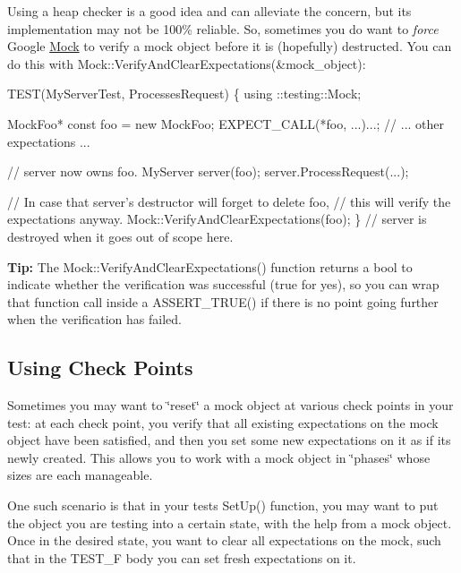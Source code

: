 Using a heap checker is a good idea and can alleviate the concern, but its implementation may not be 100\% reliable. So, sometimes you do want to {\itshape force} Google \hyperlink{class_mock}{Mock} to verify a mock object before it is (hopefully) destructed. You can do this with {\ttfamily Mock\+::\+Verify\+And\+Clear\+Expectations(\&mock\+\_\+object)}\+:


\begin{DoxyCode}
TEST(MyServerTest, ProcessesRequest) \{
  using ::testing::Mock;

  MockFoo* const foo = new MockFoo;
  EXPECT\_CALL(*foo, ...)...;
  // ... other expectations ...

  // server now owns foo.
  MyServer server(foo);
  server.ProcessRequest(...);

  // In case that server's destructor will forget to delete foo,
  // this will verify the expectations anyway.
  Mock::VerifyAndClearExpectations(foo);
\}  // server is destroyed when it goes out of scope here.
\end{DoxyCode}


{\bfseries Tip\+:} The {\ttfamily Mock\+::\+Verify\+And\+Clear\+Expectations()} function returns a {\ttfamily bool} to indicate whether the verification was successful ({\ttfamily true} for yes), so you can wrap that function call inside a {\ttfamily A\+S\+S\+E\+R\+T\+\_\+\+T\+R\+U\+E()} if there is no point going further when the verification has failed.

\subsection*{Using Check Points}

Sometimes you may want to \char`\"{}reset\char`\"{} a mock object at various check points in your test\+: at each check point, you verify that all existing expectations on the mock object have been satisfied, and then you set some new expectations on it as if it\textquotesingle{}s newly created. This allows you to work with a mock object in \char`\"{}phases\char`\"{} whose sizes are each manageable.

One such scenario is that in your test\textquotesingle{}s {\ttfamily Set\+Up()} function, you may want to put the object you are testing into a certain state, with the help from a mock object. Once in the desired state, you want to clear all expectations on the mock, such that in the {\ttfamily T\+E\+S\+T\+\_\+F} body you can set fresh expectations on it.


